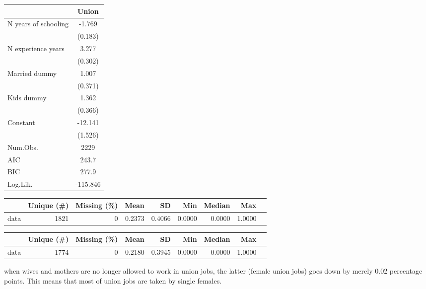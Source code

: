 \documentclass[
]{article}
\begin{document}
\begin{longtable}[]{@{}lc@{}}
\toprule
& Union \\
\midrule
\endhead
N years of schooling & -1.769 \\
& (0.183) \\
N experience years & 3.277 \\
& (0.302) \\
Married dummy & 1.007 \\
& (0.371) \\
Kids dummy & 1.362 \\
& (0.366) \\
Constant & -12.141 \\
& (1.526) \\
Num.Obs. & 2229 \\
AIC & 243.7 \\
BIC & 277.9 \\
Log.Lik. & -115.846 \\
\bottomrule
\end{longtable}

\begin{longtable}[]{@{}lrrrrrrrr@{}}
\toprule
& Unique (\#) & Missing (\%) & Mean & SD & Min & Median & Max & \\
\midrule
\endhead
data & 1821 & 0 & 0.2373 & 0.4066 & 0.0000 & 0.0000 & 1.0000 & \\
\bottomrule
\end{longtable}

\begin{longtable}[]{@{}lrrrrrrrr@{}}
\toprule
& Unique (\#) & Missing (\%) & Mean & SD & Min & Median & Max & \\
\midrule
\endhead
data & 1774 & 0 & 0.2180 & 0.3945 & 0.0000 & 0.0000 & 1.0000 & \\
\bottomrule
\end{longtable}

when wives and mothers are no longer allowed to work in union jobs, the
latter (female union jobs) goes down by merely 0.02 percentage points.
This means that most of union jobs are taken by single females.
\end{document}
